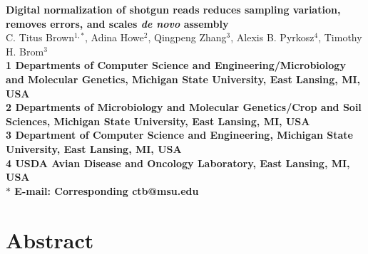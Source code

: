 \documentclass[10pt]{article}
\date{}
\begin{document}
\begin{flushleft}
{\Large
\textbf{Digital normalization of shotgun reads reduces sampling variation, removes
errors, and scales {\em de novo} assembly
}}
\\
C. Titus Brown$^{1,\ast}$, 
Adina Howe$^{2}$,
Qingpeng Zhang$^{3}$,
Alexis B. Pyrkosz$^{4}$,
Timothy H. Brom$^{3}$
\\
\bf{1} Departments of Computer Science and Engineering/Microbiology and Molecular Genetics, Michigan State University, East Lansing, MI, USA
\\
\bf{2} Departments of Microbiology and Molecular Genetics/Crop and Soil Sciences, Michigan State University, East Lansing, MI, USA
\\
\bf{3} Department of Computer Science and Engineering, Michigan State University, East Lansing, MI, USA
\\
{\bf{4} USDA Avian Disease and Oncology Laboratory, East Lansing, MI, USA}
\\
$\ast$ E-mail: Corresponding ctb@msu.edu
\end{flushleft}

\section*{Abstract}
\end{document}
